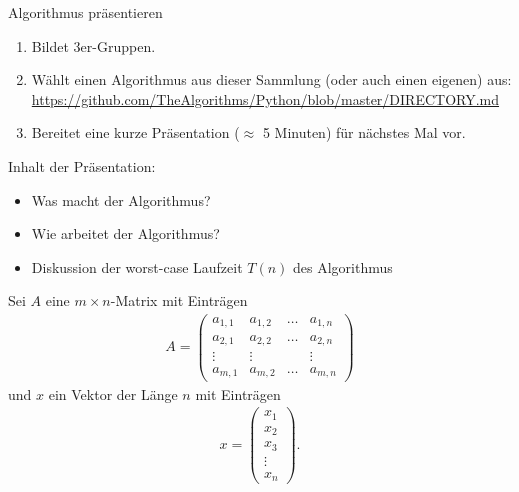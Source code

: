 \begin{frame}{Algorithmus präsentieren}
	\begin{enumerate}
		\item Bildet 3er-Gruppen.
		\item Wählt einen Algorithmus aus dieser Sammlung (oder auch einen eigenen) aus:\\
		\url{https://github.com/TheAlgorithms/Python/blob/master/DIRECTORY.md}
		\item Bereitet eine kurze Präsentation ($\approx$ 5 Minuten) für nächstes Mal vor.
	\end{enumerate}

	Inhalt der Präsentation:
	\begin{itemize}
		\item Was macht der Algorithmus?
		\item Wie arbeitet der Algorithmus?
		\item Diskussion der worst-case Laufzeit $T(n)$ des Algorithmus
	\end{itemize}
\end{frame}
\begin{frame}[fragile]
	Sei $A$ eine $m\times n$-Matrix mit Einträgen
	\begin{align*}
		A =
		\begin{pmatrix}
			a_{1,1} & a_{1,2} & \dots & a_{1,n} \\
			a_{2,1} & a_{2,2} & \dots & a_{2,n} \\
			\vdots  & \vdots  &       & \vdots  \\
			a_{m,1} & a_{m,2} & \dots & a_{m,n}
		\end{pmatrix}
	\end{align*}
	und $x$ ein Vektor der Länge $n$ mit Einträgen
	\begin{align*}
		x =
		\begin{pmatrix}
			x_1    \\
			x_2    \\
			x_3    \\
			\vdots \\
			x_n
		\end{pmatrix}.
	\end{align*}
\end{frame}

